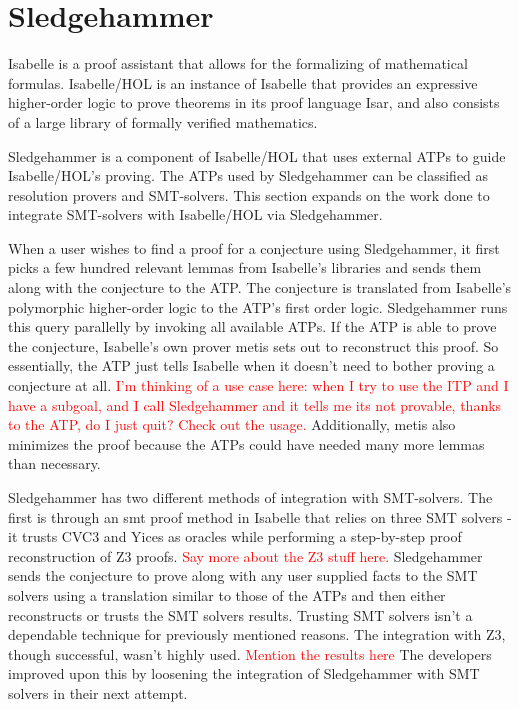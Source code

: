 \documentclass{article}
\begin{document}
\section{Sledgehammer}
\label{sec:hammer}
	Isabelle is a proof assistant that allows for the formalizing of mathematical 
	formulas. Isabelle/HOL is an instance of Isabelle that 
	provides an expressive higher-order logic to prove theorems 
	in its proof language Isar, and also consists of a large 
	library of formally verified mathematics. 
	
	Sledgehammer is a component of Isabelle/HOL that uses 
	external ATPs to guide Isabelle/HOL's proving. The ATPs 
	used by Sledgehammer can be classified as resolution 
	provers and SMT-solvers. This section expands on the work 
	done to integrate SMT-solvers with Isabelle/HOL via 
	Sledgehammer.
	
	When a user wishes to find a proof for a conjecture using 
	Sledgehammer, it first picks a few hundred relevant 
	lemmas from Isabelle's libraries and sends them along 
	with the conjecture to the ATP. The conjecture is 
	translated from Isabelle's polymorphic higher-order 
	logic to the ATP's first order logic. Sledgehammer 
	runs this query parallelly by invoking all available 
	ATPs. If the ATP is able to prove the conjecture, 
	Isabelle's own prover metis sets out to reconstruct 
	this proof. So essentially, the ATP just tells Isabelle 
	when it doesn't need to bother proving a conjecture at 
	all. \textcolor{red}{I'm thinking of a use case here: 
	when I try to use the ITP and I have a subgoal, and I 
	call Sledgehammer and it tells me its not provable, 
	thanks to the ATP, do I just quit? Check out the usage.}
	Additionally, metis also minimizes the proof because 
	the ATPs could have needed many more lemmas than necessary.
	
	Sledgehammer has two different methods of integration 
	with SMT-solvers. The first is through an smt proof 
	method in Isabelle that relies on three SMT solvers - 
	it trusts CVC3 and Yices as oracles while performing 
	a step-by-step proof reconstruction of Z3 proofs. 
	\textcolor{red}{Say more about the Z3 stuff here.}
	Sledgehammer sends the conjecture to prove along 
	with any user supplied facts to the SMT solvers 
	using a translation similar to those of the ATPs 
	and then either reconstructs or trusts the SMT solvers
	results. Trusting SMT solvers isn't a dependable 
	technique for previously mentioned reasons. The integration
	with Z3, though successful, wasn't highly used. 
	\textcolor{red}{Mention the results here} The developers
	improved upon this by loosening the integration of 
	Sledgehammer with SMT solvers in their next attempt.
	
\end{document}
